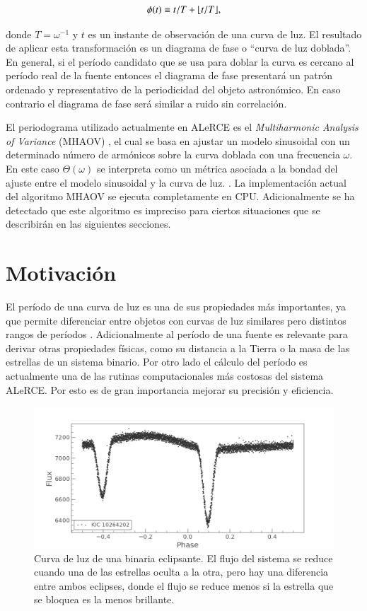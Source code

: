 \begin{equation}
\label{eq:phi}
\phi(t) \equiv t/T + \lfloor t/T\rfloor,    
\end{equation}

donde $T=\omega^{-1}$ y $t$ es un instante de observación de una curva de luz. El resultado de aplicar esta transformación es un diagrama de fase o ``curva de luz doblada''. En general, si el período candidato que se usa para doblar la curva es cercano al período real de la fuente entonces el diagrama de fase presentará un patrón ordenado y representativo de la periodicidad del objeto astronómico. En caso contrario el diagrama de fase será similar a ruido sin correlación.

El periodograma utilizado actualmente en ALeRCE es el {\it Multiharmonic Analysis of Variance} (MHAOV) \cite{MHAOV}, el cual se basa en ajustar un modelo sinusoidal con un determinado número de armónicos sobre la curva doblada con una frecuencia $\omega$. En este caso $\Theta(\omega)$ se interpreta como un métrica asociada a la bondad del ajuste entre el modelo sinusoidal y la curva de luz. \cite{MHAOV}. La implementación actual del algoritmo MHAOV se ejecuta completamente en CPU. Adicionalmente se ha detectado que este algoritmo es impreciso para ciertos situaciones que se describirán en las siguientes secciones.

\section{Motivación}\label{sec:motivacion}

El período de una curva de luz es una de sus propiedades más importantes, ya que permite diferenciar entre objetos con curvas de luz similares pero distintos rangos de períodos \cite{eyer2008variable}. Adicionalmente al período de una fuente es relevante para derivar otras propiedades físicas, como su distancia a la Tierra \cite{catelan2004rr} o la masa de las estrellas de un sistema binario. Por otro lado el cálculo del período es actualmente una de las rutinas computacionales más costosas del sistema ALeRCE. Por esto es de gran importancia mejorar su precisión y eficiencia.

\begin{figure}[t]
    \centering
    \includegraphics[scale=0.5]{lightcurve.png}
    \caption{Curva de luz de una binaria eclipsante. El flujo del sistema se reduce cuando una de las estrellas oculta a la otra, pero hay una diferencia entre ambos eclipses, donde el flujo se reduce menos si la estrella que se bloquea es la menos brillante.}
    \label{fig:eclipsantes}
\end{figure}

